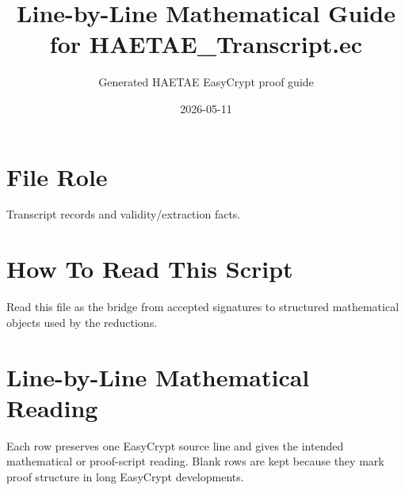\documentclass[10pt]{article}
\title{Line-by-Line Mathematical Guide for HAETAE\_Transcript.ec}
\author{Generated HAETAE EasyCrypt proof guide}
\date{2026-05-11}
\begin{document}
\maketitle

\section*{File Role}
Transcript records and validity/extraction facts.

\section*{How To Read This Script}
Read this file as the bridge from accepted signatures to structured mathematical objects used by the reductions.

\section*{Line-by-Line Mathematical Reading}
Each row preserves one EasyCrypt source line and gives the intended mathematical
or proof-script reading.  Blank rows are kept because they mark proof structure
in long EasyCrypt developments.
\end{document}
